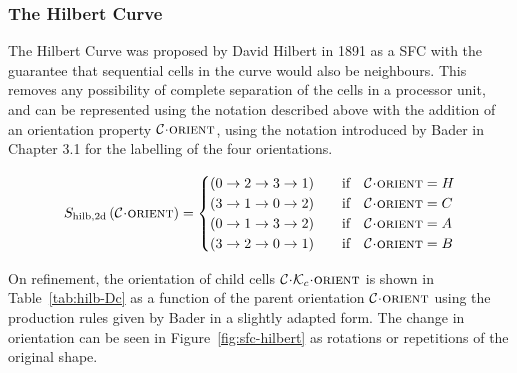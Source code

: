\documentclass[twoside]{IIBproject}
\newcommand{\acc}{{\mkern 0.5mu\cdot\mkern 0.5mu}}
\numberwithin{figure}{section}
\begin{document}

        \subsubsection{The Hilbert Curve}
            \label{sec:tftt-hilb}

            The Hilbert Curve was proposed by David Hilbert in 1891 as a SFC with the guarantee that sequential cells in the curve would also be neighbours. This removes any possibility of complete separation of the cells in a processor unit, and can be represented using the notation described above with the addition of an orientation property $\mathcal{C}\acc\textproc{orient}$, using the notation introduced by Bader in \cite{bader2013} Chapter 3.1 for the labelling of the four orientations. 

            \begin{equation}
                S_{\mathrm{hilb,2d}}\left(\mathcal{C}\acc\textproc{orient}\right) =
                \begin{cases}
                    \left( 0 \to 2 \to 3 \to 1\right) & \qif \mathcal{C}\acc\textproc{orient}=H \\
                    \left( 3 \to 1 \to 0 \to 2\right) & \qif \mathcal{C}\acc\textproc{orient}=C \\
                    \left( 0 \to 1 \to 3 \to 2\right) & \qif \mathcal{C}\acc\textproc{orient}=A \\
                    \left( 3 \to 2 \to 0 \to 1\right) & \qif \mathcal{C}\acc\textproc{orient}=B
                \end{cases}
            \end{equation}

            On refinement, the orientation of child cells $\mathcal{C}\acc\mathcal{K}_c\acc\textproc{orient}$ is shown in Table~\ref{tab:hilb-Dc} as a function of the parent orientation $\mathcal{C}\acc\textproc{orient}$ using the production rules given by Bader \cite{bader2013} in a slightly adapted form. The change in orientation can be seen in Figure~\ref{fig:sfc-hilbert} as rotations or repetitions of the original shape. 
\end{document}
